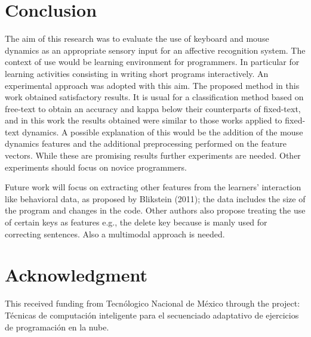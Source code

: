 \documentclass[conference]{IEEEtran}
\begin{document}
 
\section{Conclusion}
The aim of this research was to evaluate the use of keyboard and mouse dynamics 
as an appropriate sensory input for an affective recognition system. The context
of use would be learning environment for programmers. In particular for learning
activities consisting in writing short programs interactively. An experimental
approach was adopted with this aim. The proposed method in this work obtained
satisfactory results. It is usual for a classification method based on free-text
to obtain an accuracy and kappa below their counterparts of fixed-text, and in this
work the results obtained were similar to those works applied to fixed-text 
dynamics. A possible explanation of this would be the addition of the mouse 
dynamics features and the additional preprocessing performed on the feature vectors. 
While these are promising results further experiments are needed. Other experiments
should focus on novice programmers.

Future work will focus on extracting other features from the learners’ interaction
like behavioral data, as proposed by Blikstein (2011); the data includes the size
of the program and changes in the code. Other authors also propose treating the use
of certain keys as features e.g., the delete key because is manly used for correcting
sentences. Also a multimodal approach is needed. 

\section*{Acknowledgment} 
This received funding from Tecnólogico Nacional de México through the project: Técnicas de
computación inteligente para el secuenciado adaptativo de ejercicios de
programación en la nube.
  




 
 
\end{document}
